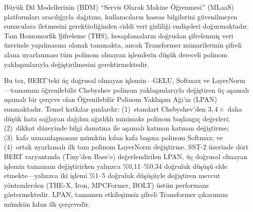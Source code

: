 \begin{ozetenv}
    Büyük Dil Modellerinin (BDM) ``Servis Olarak Makine Öğrenmesi'' (MLaaS) platformları aracılığıyla dağıtımı, kullanıcıların hassas bilgilerini güvenilmeyen sunuculara iletmesini gerektirdiğinden ciddi veri gizliliği endişeleri doğurmaktadır. Tam Homomorfik Şifreleme (THS), hesaplamaların doğrudan şifrelenmiş veri üzerinde yapılmasına olanak tanımakta, ancak Transformer mimarilerinin şifreli alana uyarlanması tüm polinom olmayan işlemlerin düşük dereceli polinom yaklaşımlarıyla değiştirilmesini gerektirmektedir.

    Bu tez, BERT'teki üç doğrusal olmayan işlemin---GELU, Softmax ve LayerNorm---tamamını öğrenilebilir Chebyshev polinom yaklaşımlarıyla değiştiren üç aşamalı aşamalı bir çerçeve olan Öğrenilebilir Polinom Yaklaşım Ağı'nı (LPAN) sunmaktadır. Temel katkılar şunlardır: (1)~standart Chebyshev'den $3,4\times$ daha düşük hata sağlayan dağılım ağırlıklı minimaks polinom başlangıç değerleri; (2)~dikkat düzeyinde bilgi damıtma ile aşamalı katman katman değiştirme; (3)~kafa uzmanlaşmasını mümkün kılan kafa başına polinom Softmax; ve (4)~ortak uyarlamalı ilk tam polinom LayerNorm değiştirme. SST-2 üzerinde dört BERT varyantında (Tiny'den Base'e) değerlendirilen LPAN, üç doğrusal olmayan işlemin tamamını değiştirirken yalnızca \%0,11--\%0,34 doğruluk düşüşü elde etmekte---yalnızca iki işlemi \%1--5 doğruluk düşüşüyle değiştiren mevcut yöntemlerden (THE-X, Iron, MPCFormer, BOLT) üstün performans göstermektedir. LPAN, tamamen etkileşimsiz şifreli Transformer çıkarımını mümkün kılan ilk çerçevedir.
\end{ozetenv}